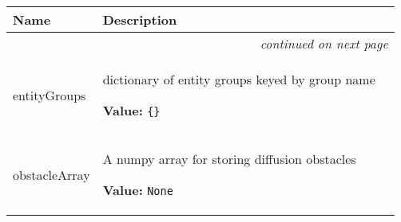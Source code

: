     \vspace{-1cm}
\hspace{\varindent}\begin{longtable}{|p{\varnamewidth}|p{\vardescrwidth}|l}
\cline{1-2}
\cline{1-2} \centering \textbf{Name} & \centering \textbf{Description}& \\
\cline{1-2}
\endhead\cline{1-2}\multicolumn{3}{r}{\small\textit{continued on next page}}\\\endfoot\cline{1-2}
\endlastfoot\raggedright e\-n\-t\-i\-t\-y\-G\-r\-o\-u\-p\-s\- & \raggedright dictionary of entity groups keyed by group name

\textbf{Value:} 
{\tt \{\}}&\\
\cline{1-2}
\raggedright o\-b\-s\-t\-a\-c\-l\-e\-A\-r\-r\-a\-y\- & \raggedright A numpy array for storing diffusion obstacles

\textbf{Value:} 
{\tt None}&\\
\cline{1-2}
\end{longtable}

